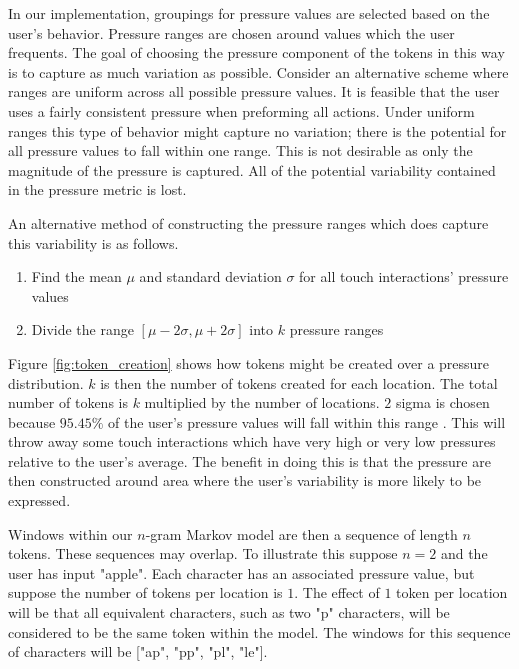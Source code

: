 In our implementation,
groupings for pressure values are selected based on the user's behavior.
Pressure ranges are chosen around values which the user frequents.
The goal of choosing 
the pressure component of the
tokens in this way is to capture
as much variation as possible.
%
Consider an alternative scheme where ranges are
uniform across all possible pressure values.
It is feasible that the user uses a fairly consistent
pressure when preforming all actions.
Under uniform ranges this type of behavior might 
capture no variation; there is the potential
for all pressure values to fall within one range.
%
This is not desirable as 
only the magnitude of the pressure is captured.
All of the potential variability contained
in the pressure metric is lost.

An alternative method of constructing
the pressure ranges which does capture 
this variability is as follows.
%
\begin{enumerate}
\item Find the mean $\mu$ and standard deviation $\sigma$ 
  for all touch interactions' pressure values
\item Divide the range $[\mu-2\sigma, \mu+2\sigma]$ into $k$ pressure ranges
\end{enumerate}
%
Figure \ref{fig:token_creation} shows
how tokens might be created over a pressure distribution.
%
$k$ is then the number of tokens created for each location.
The total number of tokens is $k$ multiplied by the number of locations.
$2$ sigma is chosen because $95.45\%$ of the user's pressure values
will fall within this range
\cite{threesigmarule}.
%
%
This will throw away some touch interactions
which have very high or very low pressures
relative to the user's average.
%
The benefit in doing this is
that the pressure are then constructed around
area where the user's variability is more likely to be expressed. %


Windows within our $n$-gram Markov model are then
a sequence of length $n$ tokens.
%
These sequences may overlap.
To illustrate this suppose $n = 2$ and the user has input "apple".
Each character has an associated pressure value,
but suppose the number of tokens per location is $1$.
The effect of $1$ token per location
will be that all equivalent characters,
such as two "p" characters, 
will be considered to be the same token within the model.
The windows for this sequence of characters will be
["ap", "pp", "pl", "le"].
%


